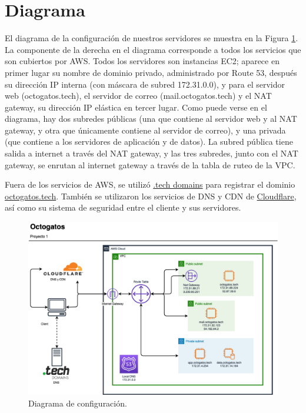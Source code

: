 \documentclass{article}
\begin{document}

\section{Diagrama}

El diagrama de la configuraci\'on de nuestros
servidores se muestra en la Figura \ref{fig:diagrama}.
La componente de la derecha en el diagrama corresponde
a todos los servicios que son cubiertos por AWS.
Todos los servidores son instancias EC2; aparece en
primer lugar su nombre de dominio privado, administrado
por Route 53, despu\'es su direcci\'on IP interna (con
m\'ascara de subred 172.31.0.0), y para el servidor web
(octogatos.tech), el servidor de correo
(mail.octogatos.tech) y el NAT gateway, su direcci\'on
IP el\'astica en tercer lugar.   Como puede verse en
el diagrama, hay dos subredes p\'ublicas (una que
contiene al servidor web y al NAT gateway, y otra que
\'unicamente contiene al servidor de correo), y una
privada (que contiene a los servidores de aplicaci\'on
y de datos).   La subred p\'ublica tiene salida a
internet a trav\'es del NAT gateway, y las tres
subredes, junto con el NAT gateway, se enrutan al
internet gateway a trav\'es de la tabla de ruteo de
la VPC.

Fuera de los servicios de AWS, se utiliz\'o
\href{https://get.tech}{.tech domains} para registrar
el dominio \href{https://octogatos.tech}{octogatos.tech}.
Tambi\'en se utilizaron los servicios de DNS y CDN de
\href{https://cloudflare.com}{Cloudflare}, as\'i como
su sistema de seguridad entre el cliente y sus
servidores.

\begin{figure}[H]
  \centering
  \includegraphics[width=\textwidth]{images/diagrama}
  \caption{Diagrama de configuraci\'on.}
  \label{fig:diagrama}
\end{figure}
\end{document}
